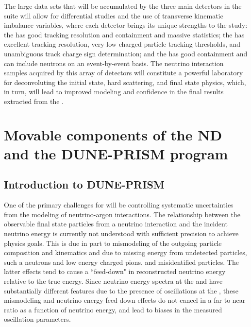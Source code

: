 The large data sets that will be accumulated by the three main detectors in the   suite will allow for differential studies and the use of transverse kinematic imbalance variables, where each detector brings its unique strengths to the study: the  has good tracking resolution and containment and massive statistics; the  has excellent tracking resolution, very low charged particle tracking thresholds, and unambiguous track charge sign determination; and the  has good containment and can include neutrons on an event-by-event basis. The neutrino interaction samples acquired by this array of detectors will constitute a powerful laboratory for deconvoluting the initial state, hard scattering, and final state physics, which, in turn, will lead to improved modeling and confidence in the final results extracted from the  .  




\section{Movable components of the ND and the DUNE-PRISM program}
\label{sec:appx-nd:nd-movable}

\subsection{Introduction to DUNE-PRISM}

One of the primary challenges for  will be controlling systematic uncertainties from the modeling of neutrino-argon interactions. The relationship between the observable final state particles from a neutrino interaction and the incident neutrino energy is currently not understood with sufficient precision to achieve  physics goals.  This is due in part to mismodeling of the outgoing particle composition and kinematics and due to missing energy from undetected particles, such a neutrons and low energy charged pions, and misidentified particles. The latter effects tend to cause  a ``feed-down" in reconstructed neutrino energy relative to the true energy. Since neutrino energy spectra at the  and  have substantially different features due to the presence of oscillations at the  , these mismodeling and neutrino energy feed-down effects do not cancel in a far-to-near ratio as a function of neutrino energy, and lead to biases in the measured oscillation parameters.

